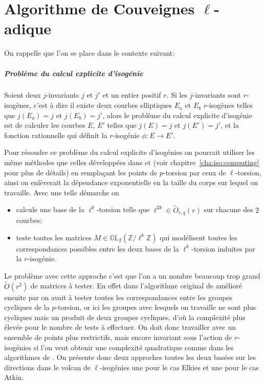 \documentclass[10pt,a4paper]{book}
\theoremstyle{plain}
\theoremstyle{definition}
\theoremstyle{definition}
\theoremstyle{definition}
\theoremstyle{definition}
\theoremstyle{remark}
\theoremstyle{remark}
\theoremstyle{definition}
\begin{document}
\chapter{Algorithme de Couveignes $\ell$-adique}
\label{cha:alg:fin}
On rappelle que l'on se place dans le contexte suivant: 

\paragraph{Problème du calcul explicite d'isogénie} \label{prob:isogeny-problem}

Soient deux $j$-invariants $j$ et $j'$ et un entier positif $r$. Si les $j$-invariants sont $r$-isogènes, c'est à dire il existe deux courbes elliptiques $E_a$ et $E_b$ $r$-isogènes telles que $j(E_a)=j$ et $j(E_b)=j'$, alors le problème du calcul explicite d'isogénie est de calculer les courbes $E$, $E'$ telles que $j(E)=j$ et $j(E')=j'$, et la fonction rationnelle qui définit la $r$-isogénie $\phi:E \rightarrow E'$.


Pour résoudre ce problème du calcul explicite d'isogénies on pourrait utiliser 
les même méthodes que celles développées dans \cite{Couveignes96} et 
\cite{DeFeo11} (voir chapitre~\ref{cha:iso:computing} pour plus de détails) en 
remplaçant les points de $p$-torsion par ceux de $\ell$-torsion, ainsi on 
enlèverait la dépendance exponentielle en la taille du corps sur lequel on 
travaille. Avec une telle démarche on 
\begin{itemize}
\item calcule une base de la $\ell^k$-torsion telle que $\ell^{2k} \in \tilde 
{O}_{r,q}(r)$ sur chacune des $2$ courbes;
\item teste toutes les matrices $M \in \mathbb{GL}_2(\mathbb{Z}/\ell^k
\mathbb{Z})$ qui modélisent toutes les correspondances possibles entre les 
deux bases de la $\ell^k$-torsion induites par la $r$-isogénie.
\end{itemize}
Le problème avec cette approche c'est que l'on a un nombre beaucoup trop grand
$\tilde O(r^2)$ de matrices à tester. En effet dans l'algorithme original de 
\cite{Couveignes96} amélioré ensuite par \cite{DeFeo11} on avait à tester 
toutes les correspondances entre les groupes cycliques de la $p$-torsion, or 
ici les groupes avec lesquels on travaille ne sont plus cycliques mais un 
produit de deux groupes cycliques, d'où la complexité plus élevée pour le nombre 
de tests à effectuer. On doit donc travailler avec un ensemble de 
points plus restrictifs, mais encore invariant sous l'action de $r$-isogénies 
si l'on veut obtenir une complexité quadratique comme dans
les algorithmes de \cite{DeFeo11}. On présente donc deux approches toutes les 
deux basées sur les directions dans le volcan de $\ell$-isogénies une pour le 
cas Elkies et une pour le cas Atkin.
\end{document}
